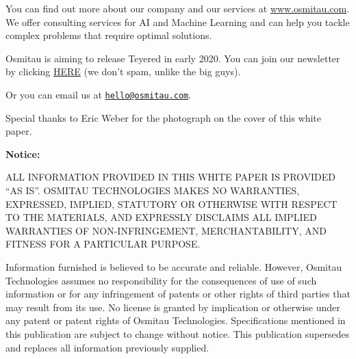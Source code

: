 \documentclass[a4paper]{article}
\begin{document}
You can find out more about our company and our services at
\url{www.osmitau.com}. We offer consulting services for AI and Machine
Learning and can help you tackle complex problems that require optimal
solutions.

Osmitau is aiming to release Teyered in early 2020. You can join our newsletter by clicking \href{http://eepurl.com/gO-J9n}{HERE} (we don't spam, unlike the big guys).

Or you can email us at \href{mailto:hello@osmitau.com}{\nolinkurl{hello@osmitau.com}}.

\newpage
{}


\newpage

\newpage
Special thanks to Eric Weber for the photograph on the cover of this
white paper.


\textbf{Notice:}  


ALL INFORMATION PROVIDED IN THIS WHITE PAPER IS PROVIDED ``AS
IS''. OSMITAU TECHNOLOGIES MAKES NO WARRANTIES, EXPRESSED, IMPLIED,
STATUTORY OR OTHERWISE WITH RESPECT TO THE MATERIALS, AND EXPRESSLY
DISCLAIMS ALL IMPLIED WARRANTIES OF NON-INFRINGEMENT, MERCHANTABILITY,
AND FITNESS FOR A PARTICULAR PURPOSE.


Information furnished is believed to be accurate and reliable. However,
Osmitau Technologies assumes no responsibility for the consequences of
use of such information or for any infringement of patents or other
rights of third parties that may result from its use. No license is
granted by implication or otherwise under any patent or patent rights of
Osmitau Technologies. Specifications mentioned in this publication are
subject to change without notice. This publication supersedes and
replaces all information previously supplied.

\newpage
\end{document}
